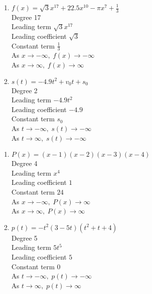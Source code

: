 \documentclass{ximera}
\begin{document}
\begin{enumerate}
\setcounter{enumi}{\value{HW}}

\item $f(x) = \sqrt{3}x^{17} + 22.5x^{10} - \pi x^{7} + \frac{1}{3}$\\
Degree 17 \\
Leading term $\sqrt{3}x^{17}$\\
Leading coefficient $\sqrt{3}$\\
Constant term $\frac{1}{3}$\\
As $x \rightarrow -\infty, \; f(x) \rightarrow -\infty$\\
As $x \rightarrow \infty, \; f(x) \rightarrow \infty$\\


\item $s(t) = -4.9t^{2} + v_{0}t + s_{0}$\\
Degree 2 \\
Leading term $-4.9t^{2}$\\
Leading coefficient $-4.9$\\
Constant term $s_{0}$\\
As $t \rightarrow -\infty, \; s(t) \rightarrow -\infty$\\
As $t \rightarrow \infty, \; s(t) \rightarrow -\infty$\\


\setcounter{HW}{\value{enumi}}
\end{enumerate}

\begin{enumerate}
\setcounter{enumi}{\value{HW}}


\item $P(x) = (x - 1)(x - 2)(x - 3)(x - 4)$\\
Degree 4 \\
Leading term $x^{4}$\\
Leading coefficient $1$\\
Constant term $24$\\
As $x \rightarrow -\infty, \; P(x) \rightarrow \infty$\\
As $x \rightarrow \infty, \; P(x) \rightarrow \infty$\\

\item $p(t) = -t^2(3 - 5t)(t^{2} + t + 4)$\\
Degree 5 \\
Leading term $5t^{5}$\\
Leading coefficient $5$\\
Constant term $0$\\
As $t \rightarrow -\infty, \; p(t) \rightarrow -\infty$\\
As $t \rightarrow \infty, \; p(t) \rightarrow \infty$\\

\setcounter{HW}{\value{enumi}}
\end{enumerate}
\end{document}
